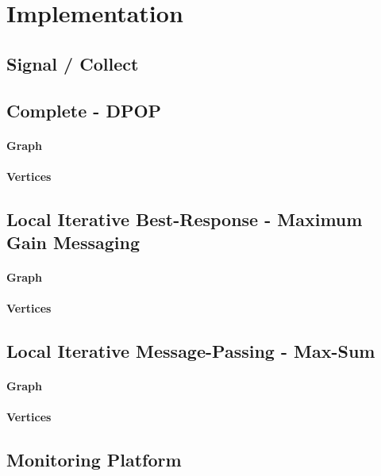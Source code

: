 \chapter{Implementation}

\section{Signal / Collect}

\section{Complete - DPOP}
\subsubsection{Graph}
\subsubsection{Vertices}

\section{Local Iterative Best-Response - Maximum Gain Messaging}
\subsubsection{Graph}
\subsubsection{Vertices}

\section{Local Iterative Message-Passing - Max-Sum}
\subsubsection{Graph}
\subsubsection{Vertices}

\section{Monitoring Platform}

